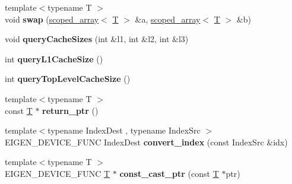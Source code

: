 \begin{DoxyCompactItemize}
\item 
\mbox{\label{namespace_eigen_1_1internal_aefb14fc87518cc6b91063a820a66a21b}} 
{\footnotesize template$<$typename T $>$ }\\void {\bfseries swap} (\hyperlink{class_eigen_1_1internal_1_1scoped__array}{scoped\+\_\+array}$<$ \hyperlink{group___sparse_core___module}{T} $>$ \&a, \hyperlink{class_eigen_1_1internal_1_1scoped__array}{scoped\+\_\+array}$<$ \hyperlink{group___sparse_core___module}{T} $>$ \&b)
\item 
\mbox{\label{namespace_eigen_1_1internal_a3a3f70166790e15844d6b9804f84f952}} 
void {\bfseries query\+Cache\+Sizes} (int \&l1, int \&l2, int \&l3)
\item 
\mbox{\label{namespace_eigen_1_1internal_abc24477d9f0a7445aa8ece2b5b7a0b7b}} 
int {\bfseries query\+L1\+Cache\+Size} ()
\item 
\mbox{\label{namespace_eigen_1_1internal_ab12a6ee511234693252cf02dfef07899}} 
int {\bfseries query\+Top\+Level\+Cache\+Size} ()
\item 
\mbox{\label{namespace_eigen_1_1internal_a1f6a1aca2368e0dc47d3a2b6b4c221e9}} 
{\footnotesize template$<$typename T $>$ }\\const \hyperlink{group___sparse_core___module}{T} $\ast$ {\bfseries return\+\_\+ptr} ()
\item 
\mbox{\label{namespace_eigen_1_1internal_a66f17ef65b1821965dcb8ad9a660b064}} 
{\footnotesize template$<$typename Index\+Dest , typename Index\+Src $>$ }\\E\+I\+G\+E\+N\+\_\+\+D\+E\+V\+I\+C\+E\+\_\+\+F\+U\+NC Index\+Dest {\bfseries convert\+\_\+index} (const Index\+Src \&idx)
\item 
\mbox{\label{namespace_eigen_1_1internal_a53454178d54621169eded201cec9f05e}} 
{\footnotesize template$<$typename T $>$ }\\E\+I\+G\+E\+N\+\_\+\+D\+E\+V\+I\+C\+E\+\_\+\+F\+U\+NC \hyperlink{group___sparse_core___module}{T} $\ast$ {\bfseries const\+\_\+cast\+\_\+ptr} (const \hyperlink{group___sparse_core___module}{T} $\ast$ptr)

\end{DoxyCompactItemize}
